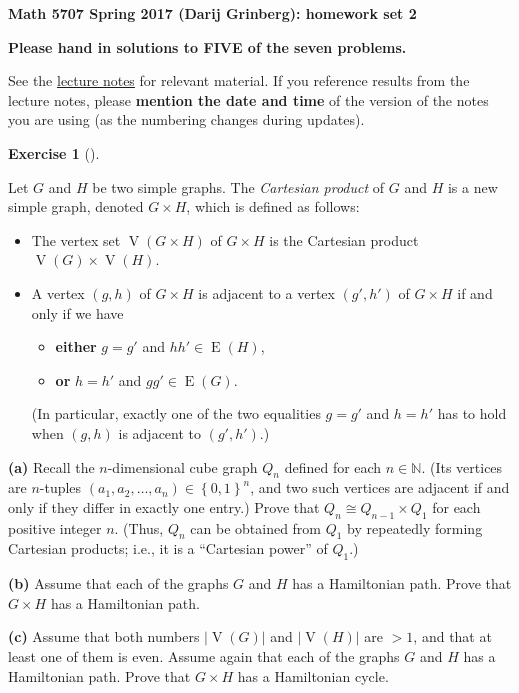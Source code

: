 \documentclass[numbers=enddot,12pt,final,onecolumn,notitlepage]{scrartcl}%
\newcounter{exer}
\theoremstyle{definition}
\newtheorem{exmp}[exer]{Exercise}
\newenvironment{exercise}[1][]
{\begin{exmp}[#1]\begin{leftbar}}
{\end{leftbar}\end{exmp}}
\newcommand{\NN}{\mathbb{N}}
\newcommand{\set}[1]{\left\{ #1 \right\}}
\newcommand{\abs}[1]{\left| #1 \right|}
\newcommand{\tup}[1]{\left( #1 \right)}
\newcommand{\verts}[1]{\operatorname{V}\left( #1 \right)}
\newcommand{\edges}[1]{\operatorname{E}\left( #1 \right)}
\begin{document}
\begin{center}
\textbf{Math 5707 Spring 2017 (Darij Grinberg): homework set 2}


\textbf{Please hand in solutions to FIVE of the seven problems.}
\end{center}

See the \href{http://www-users.math.umn.edu/~dgrinber/5707s17/nogra.pdf}{lecture notes} for relevant material.
If you reference results from the lecture notes, please \textbf{mention the date and time} of the version of the notes you are using (as the numbering changes during updates).

\begin{exercise}
Let $G$ and $H$ be two simple graphs. The \textit{Cartesian product} of $G$
and $H$ is a new simple graph, denoted $G \times H$, which is defined as
follows:
\begin{itemize}
\item The vertex set $\verts{G \times H}$ of $G \times H$ is the
Cartesian product $\verts{G} \times \verts{H}$.

\item A vertex $\tup{g, h}$ of $G \times H$ is adjacent to a vertex
$\tup{g', h'}$ of $G \times H$ if and only if we have
\begin{itemize}
\item \textbf{either} $g = g'$ and $hh' \in \edges{H}$,
\item \textbf{or} $h = h'$ and $gg' \in \edges{G}$.
\end{itemize}
(In particular, exactly one of the two equalities $g = g'$ and $h = h'$
has to hold when $\tup{g, h}$ is adjacent to $\tup{g', h'}$.)
\end{itemize}

\textbf{(a)} Recall the $n$-dimensional cube graph $Q_n$ defined for
each $n \in \NN$. (Its vertices are $n$-tuples $\tup{a_1, a_2, \ldots,
a_n} \in \set{0, 1}^n$, and two such vertices are adjacent if and only
if they differ in exactly one entry.) Prove that $Q_n \cong
Q_{n-1} \times Q_1$ for each positive integer $n$. (Thus, $Q_n$ can
be obtained from $Q_1$ by repeatedly forming Cartesian products; i.e.,
it is a ``Cartesian power'' of $Q_1$.)

\textbf{(b)} Assume that each of the graphs $G$ and $H$ has a
Hamiltonian path. Prove that $G \times H$ has a Hamiltonian path.

\textbf{(c)} Assume that both numbers $\abs{\verts{G}}$ and
$\abs{\verts{H}}$ are $> 1$, and that at least one of them is even.
Assume again that each of the graphs $G$ and $H$ has a Hamiltonian
path. Prove that $G \times H$ has a Hamiltonian cycle.

\end{exercise}
\end{document}

